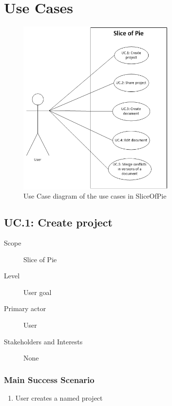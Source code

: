 \section{Use Cases}
\label{sec:use-cases}

\begin{figure}[htb]
	\centering
	\includegraphics[width=0.7\textwidth]{Appendices/graphics/use-cases-01.png}
	\caption{Use Case diagram of the use cases in SliceOfPie}
	\label{fig:use-cases-01}
\end{figure}

\subsection{UC.1: Create project}
\begin{description}
    \item[Scope] Slice of Pie
    \item[Level] User goal
    \item[Primary actor] User
    \item[Stakeholders and Interests] None
\end{description}
    
\subsubsection{Main Success Scenario}
\begin{enumerate}
    \item User creates a named project
\end{enumerate}
    
